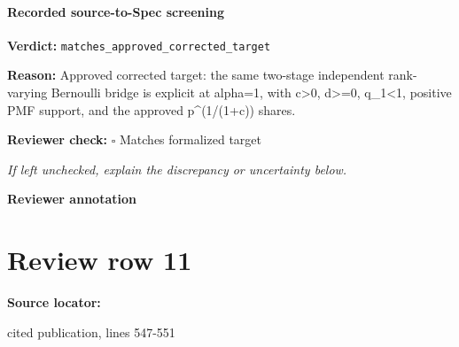 \documentclass[10pt]{article}
\newcommand{\reviewerbox}{%
  \par\noindent\fbox{\parbox{0.96\linewidth}{\rule{0pt}{0.38in}}}\par
}
\newcommand{\reviewmatch}[1]{%
  \par\noindent\textbf{Reviewer check:} $\square$\; #1\par
  \noindent\emph{If left unchecked, explain the discrepancy or uncertainty below.}\par
}
\begin{document}
\paragraph{Recorded source-to-Spec screening}
\textbf{Verdict:} \texttt{matches\_approved\_corrected\_target}
\\
{\raggedright
\textbf{Reason:} Approved corrected target:\allowbreak{} the same two-\allowbreak{}stage independent rank-\allowbreak{}varying Bernoulli bridge is explicit at alpha=1, with c>0, d>=0, q\_\allowbreak{}1<1, positive PMF support, and the approved p\textasciicircum{}(1/\allowbreak{}(1+c)) shares.\allowbreak{}
\par}
\reviewmatch{Matches formalized target}
\noindent\textbf{Reviewer annotation}\par
\reviewerbox
\clearpage
\hypertarget{source-claim-3057a09badb30d45}{}
\section*{Review row 11}
\textbf{Source locator:} {\footnotesize\raggedright cited publication, lines 547-\allowbreak{}551\par}
\end{document}
